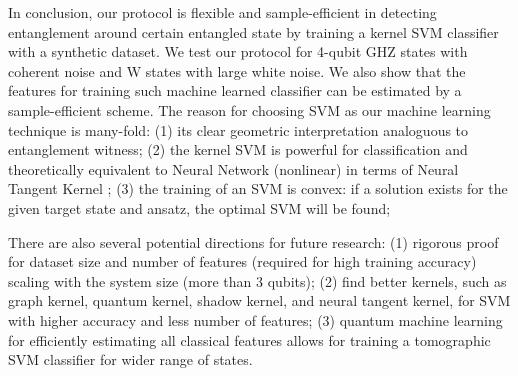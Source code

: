 \documentclass[
aps,
pra,
twocolumn,
floatfix,
]{revtex4-2}
\theoremstyle{plain}
\theoremstyle{definition}
\newcommand{\pob}{O}
\newcommand{\dm}{\rho}
\begin{document}
In conclusion,
our protocol is flexible and sample-efficient in detecting entanglement around certain entangled state by training a kernel SVM classifier with a synthetic dataset.
We test our protocol for 4-qubit GHZ states with coherent noise and W states with large white noise.
We also show that the features for training such machine learned classifier can be estimated by a sample-efficient scheme.
The reason for choosing SVM as our machine learning technique is many-fold:
(1) its clear geometric interpretation analoguous to entanglement witness;
(2) the kernel SVM is powerful for classification and theoretically equivalent to Neural Network (nonlinear) in terms of Neural Tangent Kernel \cite{jacotNeuralTangentKernel2020};
(3) the training of an SVM is convex: if a solution exists for the given target state and ansatz, the optimal SVM will be found;

There are also several potential directions for future research:
(1) rigorous proof for dataset size and number of features (required for high training accuracy) scaling with the system size (more than 3 qubits);
(2) find better kernels, such as graph kernel, quantum kernel, shadow kernel, and neural tangent kernel, for SVM with higher accuracy and less number of features;
(3) quantum machine learning for efficiently estimating all classical features allows for training a tomographic SVM classifier for wider range of states.
\end{document}
